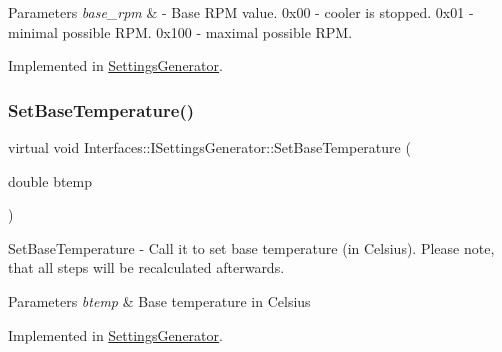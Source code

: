 \begin{DoxyParams}{Parameters}
{\em base\+\_\+rpm} & -\/ Base R\+PM value. 0x00 -\/ cooler is stopped. 0x01 -\/ minimal possible R\+PM. 0x100 -\/ maximal possible R\+PM. \\
\hline
\end{DoxyParams}


Implemented in \hyperlink{class_settings_generator_a1c1960b9021f7081b4c42c4d7c0eda34}{Settings\+Generator}.

\mbox{\label{class_interfaces_1_1_i_settings_generator_a8b60ba05790994db0303b251f655e95d}} 
\subsubsection{\texorpdfstring{Set\+Base\+Temperature()}{SetBaseTemperature()}}
{\footnotesize\ttfamily virtual void Interfaces\+::\+I\+Settings\+Generator\+::\+Set\+Base\+Temperature (\begin{DoxyParamCaption}\item[{double}]{btemp }\end{DoxyParamCaption})\hspace{0.3cm}{\ttfamily [pure virtual]}}



Set\+Base\+Temperature -\/ Call it to set base temperature (in Celsius). Please note, that all steps will be recalculated afterwards. 


\begin{DoxyParams}{Parameters}
{\em btemp} & Base temperature in Celsius \\
\hline
\end{DoxyParams}


Implemented in \hyperlink{class_settings_generator_aed9e7acb30bfd559b1ac70ceeddd8973}{Settings\+Generator}.

\mbox{\label{class_interfaces_1_1_i_settings_generator_af681d36295e95bd52cbfd1bbc3ae8cf9}} 
